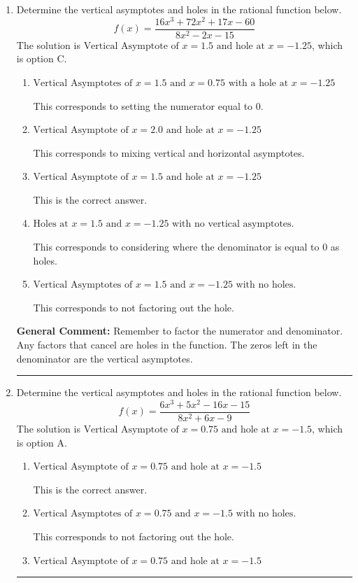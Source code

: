 \documentclass{extbook}[14pt]
\newcommand{\litem}[1]{\item #1

\rule{\textwidth}{0.4pt}}
\begin{document}
\begin{enumerate}\litem{
Determine the vertical asymptotes and holes in the rational function below.
\[ f(x) = \frac{16x^{3} +72 x^{2} +17 x -60}{8x^{2} -2 x -15} \]The solution is \( \text{Vertical Asymptote of } x = 1.5 \text{ and hole at } x = -1.25 \), which is option C.\begin{enumerate}[label=\Alph*.]
\item \( \text{Vertical Asymptotes of } x = 1.5 \text{ and } x = 0.75 \text{ with a hole at } x = -1.25 \)

This corresponds to setting the numerator equal to 0.
\item \( \text{Vertical Asymptote of } x = 2.0 \text{ and hole at } x = -1.25 \)

This corresponds to mixing vertical and horizontal asymptotes.
\item \( \text{Vertical Asymptote of } x = 1.5 \text{ and hole at } x = -1.25 \)

This is the correct answer.
\item \( \text{Holes at } x = 1.5 \text{ and } x = -1.25 \text{ with no vertical asymptotes.} \)

This corresponds to considering where the denominator is equal to 0 as holes.
\item \( \text{Vertical Asymptotes of } x = 1.5 \text{ and } x = -1.25 \text{ with no holes.} \)

This corresponds to not factoring out the hole.
\end{enumerate}

\textbf{General Comment:} Remember to factor the numerator and denominator. Any factors that cancel are holes in the function. The zeros left in the denominator are the vertical asymptotes.
}
\litem{
Determine the vertical asymptotes and holes in the rational function below.
\[ f(x) = \frac{6x^{3} +5 x^{2} -16 x -15}{8x^{2} +6 x -9} \]The solution is \( \text{Vertical Asymptote of } x = 0.75 \text{ and hole at } x = -1.5 \), which is option A.\begin{enumerate}[label=\Alph*.]
\item \( \text{Vertical Asymptote of } x = 0.75 \text{ and hole at } x = -1.5 \)

This is the correct answer.
\item \( \text{Vertical Asymptotes of } x = 0.75 \text{ and } x = -1.5 \text{ with no holes.} \)

This corresponds to not factoring out the hole.
\item \( \text{Vertical Asymptote of } x = 0.75 \text{ and hole at } x = -1.5 \)


\end{enumerate}}
\end{enumerate}
\end{document}
